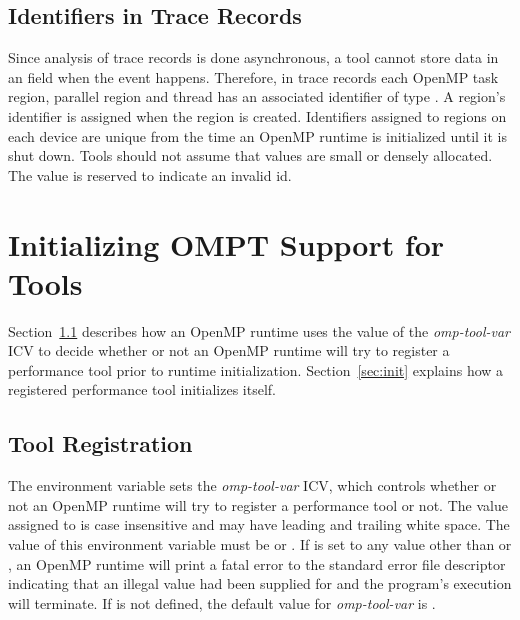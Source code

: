 \documentclass{article}
\begin{document}
\subsection{Identifiers in Trace Records}
Since analysis of trace records is done asynchronous, a tool cannot store
data in an  field when the event happens. 
Therefore, in trace records each OpenMP task region, parallel region and 
thread has an associated identifier of type . 
A region’s identifier is assigned when the region is created. 
Identifiers assigned to regions on each device are unique from the time an 
OpenMP runtime is initialized until it is shut down.
Tools should not assume that  values are small or densely
allocated. The value  is reserved to indicate an
invalid id.




\section{Initializing OMPT Support for Tools}
\label{sec:enabling}

Section~\ref{sec:env} describes how an OpenMP runtime uses the value of the {\em omp-tool-var} ICV to decide whether or not an OpenMP runtime will try to register a performance tool prior to runtime initialization.
Section~\ref{sec:init} explains how a registered performance tool initializes itself.

\subsection{Tool Registration}
\label{sec:env}

The   environment variable sets the {\em omp-tool-var} ICV, which controls whether or not an OpenMP 
runtime will try to register a performance tool or not. The value assigned to  is 
case insensitive and may have leading and trailing white space.  The value of
this environment variable must be  or .   If   is set to any value other than  or , an OpenMP runtime will print a fatal error  to the standard error file descriptor indicating that an illegal value had been supplied for  and the program's execution will terminate. If  is not defined, the default value for  {\em omp-tool-var}  is  .
\end{document}
